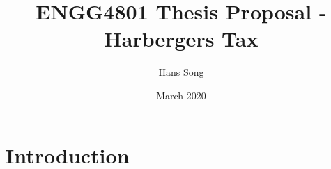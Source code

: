 \documentclass{article}
\title{ENGG4801 Thesis Proposal - Harbergers Tax}
\author{Hans Song}
\date{March 2020}
\begin{document}
\maketitle

\section{Introduction}
\end{document}
